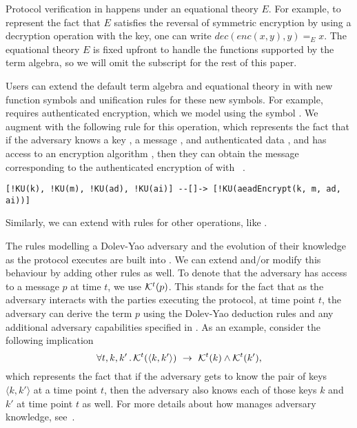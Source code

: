 Protocol verification in \mTamarin{} happens under an equational theory $E$.
%
For example, to represent the fact that $E$ satisfies the reversal of symmetric encryption by using a decryption operation with the key, one can write $\textit{dec}(\textit{enc}(x, y), y) =_{E} x$. 
%
The equational theory $E$ is fixed upfront to handle the functions supported by the term algebra, so we will omit the subscript for the rest of this paper.
%

Users can extend the default term algebra and equational theory in \mTamarin{} with new function symbols and unification rules for these new symbols.
%
For example, \mEdhoc{} requires authenticated encryption, which we model using the symbol . 
%
We augment \mTamarin{} with the following rule for this operation, which represents the fact that if the adversary knows a key , a message , and authenticated data , and has access to an encryption algorithm , then they can obtain the message corresponding to the authenticated encryption of  with ~\cite{Norr21}.
\begin{verbatim}
[!KU(k), !KU(m), !KU(ad), !KU(ai)] --[]-> [!KU(aeadEncrypt(k, m, ad, ai))]
\end{verbatim}
%
Similarly, we can extend \mTamarin{} with rules for other operations, like \mXor{}.

%
The rules modelling a Dolev-Yao adversary and the evolution of their knowledge as the protocol executes are built into \mTamarin.
%
We can extend and/or modify this behaviour by adding other rules as well.
%
To denote that the adversary has access to a message $p$ at time $t$, we use $\mathcal{K}^{t}(p)$.
%
This stands for the fact that as the adversary interacts with the parties executing the protocol, at time point $t$, the adversary can derive the term $p$ using the Dolev-Yao deduction rules and any additional adversary capabilities specified in \mTamarin.
%
As an example, consider the following implication 
\[
    \forall t, k, k'\mLogicDot \mK^{t}(\langle k, k'\rangle)\ \rightarrow\ 
\mK^{t}(k) \land \mK^{t}(k'),
\]
which represents the fact that if the adversary gets to know the pair of keys $\langle k, k' \rangle$ at a time point $t$, then the adversary also knows each of those keys $k$ and $k'$ at time point $t$ as well.
%
For more details about how \mTamarin{} manages adversary knowledge, see~\cite{DBLP:conf/cav/MeierSCB13}.
%


